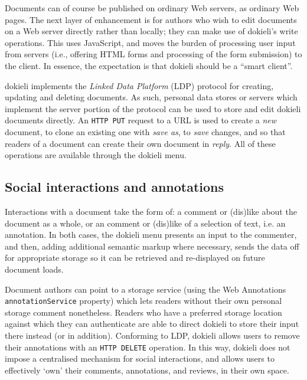 \documentclass[a4paper]{llncs}
\begin{document}
\par Documents can of course be published on ordinary Web servers, as ordinary Web pages. The next layer of enhancement is for authors who wish to edit documents on a Web server directly rather than locally; they can make use of dokieli’s write operations. This uses JavaScript, and moves the burden of processing user input from servers (i.e., offering HTML forms and processing of the form submission) to the client.  In essence, the expectation is that dokieli should be a ``smart client''.
                                    
                                    
\par dokieli implements the \textit{Linked Data Platform} (LDP) protocol for creating, updating and deleting documents. As such, personal data stores or servers which implement the server portion of the protocol can be used to store and edit dokieli documents directly. An {\tt HTTP PUT} request to a URL is used to create a \textit{new} document, to clone an existing one with \textit{save as}, to \textit{save} changes, and so that readers of a document can create their own document in \textit{reply}. All of these operations are available through the dokieli menu.
                                
                            

                            
                                \subsection{Social interactions and annotations}
  \label{social-interactions-and-annotations}

                                
                                    
\par Interactions with a document take the form of: a comment or (dis)like about the document as a whole, or an comment or (dis)like of a selection of text, i.e. an annotation. In both cases, the dokieli menu presents an input to the commenter, and then, adding additional semantic markup where necessary, sends the data off for appropriate storage so it can be retrieved and re-displayed on future document loads.

                                    
\par Document authors can point to a storage service (using the Web Annotations {\tt annotationService} property) which lets readers without their own personal storage comment nonetheless. Readers who have a preferred storage location against which they can authenticate are able to direct dokieli to store their input there instead (or in addition). Conforming to LDP, dokieli allows users to remove their annotations with an {\tt HTTP DELETE} operation. In this way, dokieli does not impose a centralised mechanism for social interactions, and allows users to effectively ‘own’ their comments, annotations, and reviews, in their own space.
\end{document}
